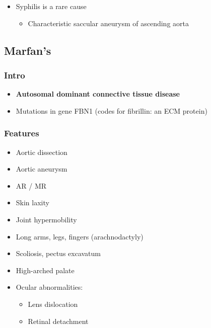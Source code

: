 \documentclass[
  12pt,
]{memoir}
\providecommand{\tightlist}{%
  \setlength{\itemsep}{0pt}\setlength{\parskip}{0pt}}
\begin{document}
\begin{itemize}
\tightlist
\item
  Syphilis is a rare cause

  \begin{itemize}
  \tightlist
  \item
    Characteristic saccular aneurysm of ascending aorta
  \end{itemize}
\end{itemize}

\hypertarget{marfans}{%
\subsection{Marfan's}\label{marfans}}

\hypertarget{intro-6}{%
\subsubsection{Intro}\label{intro-6}}

\begin{itemize}
\tightlist
\item
  \textbf{Autosomal dominant connective tissue disease}
\item
  Mutations in gene FBN1 (codes for fibrillin: an ECM protein)
\end{itemize}

\hypertarget{features-5}{%
\subsubsection{Features}\label{features-5}}

\begin{itemize}
\tightlist
\item
  Aortic dissection
\item
  Aortic aneurysm
\item
  AR / MR
\item
  Skin laxity
\item
  Joint hypermobility
\item
  Long arms, legs, fingers (arachnodactyly)
\item
  Scoliosis, pectus excavatum
\item
  High-arched palate
\item
  Ocular abnormalities:

  \begin{itemize}
  \tightlist
  \item
    Lens dislocation
  \item
    Retinal detachment
  \end{itemize}
\end{itemize}
\end{document}
